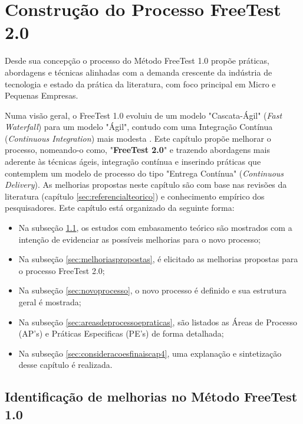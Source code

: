 \chapter{Construção do Processo FreeTest 2.0}
\label{sec:construcaoframeworkprocesso}

Desde sua concepção o processo do Método FreeTest 1.0 propõe práticas, abordagens e técnicas alinhadas com a demanda crescente da indústria de tecnologia e estado da prática da literatura, com foco principal em Micro e Pequenas Empresas. 

Numa visão geral, o FreeTest 1.0 evoluiu de um modelo "Cascata-Ágil" (\textit{Fast Waterfall}) para um modelo "Ágil", contudo com uma Integração Contínua (\textit{Continuous Integration}) mais modesta \cite{sauceLabes2017}. Este capítulo propõe melhorar o processo, nomeando-o como, "\textbf{FreeTest 2.0}" e trazendo abordagens mais aderente às técnicas ágeis, integração contínua e inserindo práticas que contemplem um modelo de processo do tipo "Entrega Contínua" (\textit{Continuous Delivery}). As melhorias propostas neste capítulo são com base nas revisões da literatura (capítulo \ref{sec:referencialteorico}) e conhecimento empírico dos pesquisadores. Este capítulo está organizado da seguinte forma:

\begin{itemize}
    \item Na subseção \ref{sec:identificacaomelhoriasfreetest}, os estudos com embasamento teórico são mostrados com a intenção de evidenciar as possíveis melhorias para o novo processo;
    \item Na subseção \ref{sec:melhoriaspropostas}, é elicitado as melhorias propostas para o processo FreeTest 2.0;
    \item Na subseção \ref{sec:novoprocesso}, o novo processo é definido e sua estrutura geral é mostrada;
    \item Na subseção \ref{sec:areasdeprocessoepraticas}, são listados as Áreas de Processo (AP's) e Práticas Especificas (PE's) de forma detalhada;
    \item Na subseção \ref{sec:consideracoesfinaiscap4}, uma explanação e sintetização desse capítulo é realizada.
\end{itemize}

\section{Identificação de melhorias no Método FreeTest 1.0}
\label{sec:identificacaomelhoriasfreetest}

